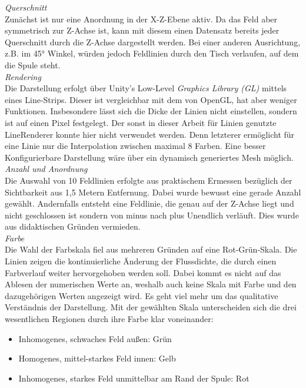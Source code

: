 \textit{Querschnitt}\\
Zunächst ist nur eine Anordnung in der X-Z-Ebene aktiv. Da das Feld aber symmetrisch zur Z-Achse ist, kann mit diesem einen Datensatz bereits jeder Querschnitt durch die Z-Achse dargestellt werden. Bei einer anderen Ausrichtung, z.B. im 45° Winkel, würden jedoch Feldlinien durch den Tisch verlaufen, auf dem die Spule steht.\\

\textit{Rendering}\\
Die Darstellung erfolgt über Unity's Low-Level \textit{Graphics Library (GL)} mittels eines Line-Strips. Dieser ist vergleichbar mit dem von OpenGL, hat aber weniger Funktionen. Insbesondere lässt sich die Dicke der Linien nicht einstellen, sondern ist auf einen Pixel festgelegt. Der sonst in dieser Arbeit für Linien genutzte LineRenderer konnte hier nicht verwendet werden. Denn letzterer ermöglicht für eine Linie nur die Interpolation zwischen maximal 8 Farben. Eine besser Konfigurierbare Darstellung wäre über ein dynamisch generiertes Mesh möglich.\\

\textit{Anzahl und Anordnung}\\
Die Auswahl von 10 Feldlinien erfolgte aus praktischem Ermessen bezüglich der Sichtbarkeit aus 1,5 Metern Entfernung. Dabei wurde bewusst eine gerade Anzahl gewählt. Andernfalls entsteht eine Feldlinie, die genau auf der Z-Achse liegt und nicht geschlossen ist sondern von minus nach plus Unendlich verläuft. Dies wurde aus didaktischen Gründen vermieden.\\

\textit{Farbe}\\
Die Wahl der Farbskala fiel aus mehreren Gründen auf eine Rot-Grün-Skala. Die Linien zeigen die kontinuierliche Änderung der Flussdichte, die durch einen Farbverlauf weiter hervorgehoben werden soll. Dabei kommt es nicht auf das Ablesen der numerischen Werte an, weshalb auch keine Skala mit Farbe und den dazugehörigen Werten angezeigt wird. Es geht viel mehr um das qualitative Verständnis der Darstellung. Mit der gewählten Skala unterscheiden sich die drei wesentlichen Regionen durch ihre Farbe klar voneinander:
\begin{itemize}
	\setlength{\itemsep}{-1pt}
	\singlespacing
	\item Inhomogenes, schwaches Feld außen: Grün
	\item Homogenes, mittel-starkes Feld innen: Gelb
	\item Inhomogenes, starkes Feld unmittelbar am Rand der Spule: Rot
\end{itemize}

